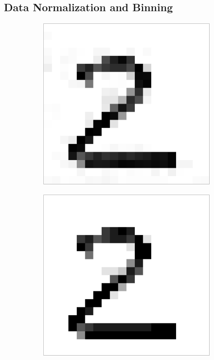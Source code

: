 \subsection{Data Normalization and Binning}
\begin{figure}[h]
\centering
    \begin{subfigure}{0.2\textwidth}
        \includegraphics[width = \textwidth]{graphics/bins_inf}
    \end{subfigure}
    \begin{subfigure}{0.2\textwidth}
        \includegraphics[width = \textwidth]{graphics/bins_10}

\end{subfigure}
\end{figure}
